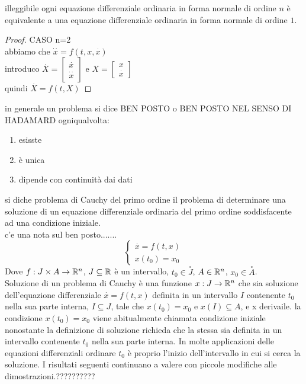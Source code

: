 \observation
illeggibile
\proposition
ogni equazione differenziale ordinaria  in forma normale di ordine $n$ è equivalente a una equazione differenziale ordinaria in forma normale di ordine $1$.\\
\begin{proof}
CASO n=2\\
abbiamo che $\overset{\cdot\cdot}{x}=f(t,x,\overset{\cdot}{x})$\\
introduco $\overset{\cdot}{X}=\begin{bmatrix}\overset{\cdot}{x}\\\overset{\cdot\cdot}{x}\end{bmatrix}$ e $X=\begin{bmatrix}x\\\overset{\cdot}{x}\end{bmatrix}$\\
quindi $\overset{\cdot}{X}=f(t,X)$
\end{proof} 
\observation
in generale un problema si dice BEN POSTO o BEN POSTO NEL SENSO DI HADAMARD ogniqualvolta:
\begin{enumerate}
	\item esisste
	\item è unica
	\item dipende con continuità dai dati
\end{enumerate} 
si diche problema di Cauchy del primo ordine il problema di determinare una soluzione di un equazione differenziale ordinaria del primo ordine soddisfacente ad una condizione iniziale.\\
c'e una nota sul ben posto.......\\
$$\left\{\begin{matrix}
\overset{\cdot}{x}=f(t,x)\\x(t_0)=x_0
\end{matrix}\right.$$
Dove $f:J\times A\to \mathbb{R}^n$, $J\subseteq \mathbb{R}$ è un intervallo, $t_0\in\overset{\circ}{J}$, $A\in \mathbb{R}^n$, $x_0\in\overset{\circ}{A}$.\\
Soluzione di un problema di Cauchy è una funzione $x:J\to \mathbb{R}^n$ che sia soluzione dell'equazione differenziale $\overset{\cdot}{x}=f(t,x)$ definita in un intervallo $I$ contenente $t_0$ nella sua parte interna, $I\subseteq J$, tale che $x(t_0)=x_0$ e $x(I)\subseteq A$, e x derivaile.
\observation
la condizione $x(t_0)=x_0$ viene abitualmente chiamata condizione iniziale nonostante la definizione di soluzione richieda che la stessa sia definita in un intervallo contenente $t_0$ nella sua parte interna. In molte applicazioni delle equazioni differenziali ordinare $t_0$ è proprio l'inizio dell'intervallo in cui si cerca la soluzione. I risultati seguenti continuano a valere con piccole modifiche alle dimostrazioni.??????????
